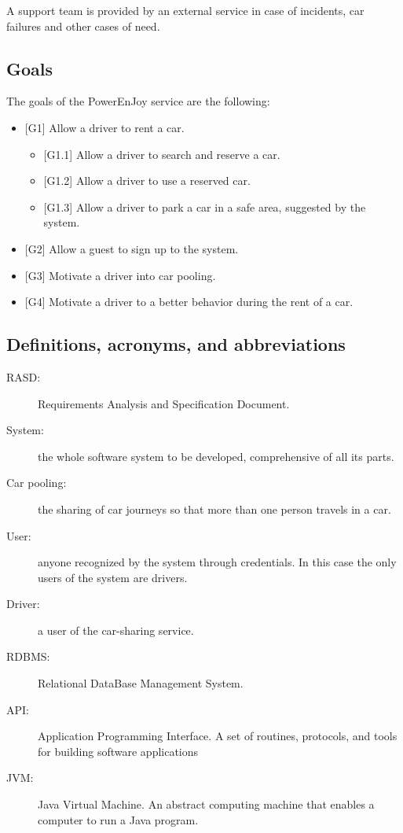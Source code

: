 A support team is provided by an external service in case of incidents, car failures and other cases of need.

\subsection{Goals}
The goals of the PowerEnJoy service are the following:
\begin{itemize}
	\item {[G1]} Allow a driver to rent a car. 
	\begin{itemize}
		\item {[G1.1]} Allow a driver to search and reserve a car. 
		\item {[G1.2]} Allow a driver to use a reserved car. 
		\item {[G1.3]} Allow a driver to park a car in a safe area, suggested by the system.
	\end{itemize} 
	\item {[G2]} Allow a guest to sign up to the system. 
	\item {[G3]} Motivate a driver into car pooling. 
	\item {[G4]} Motivate a driver to a better behavior during the rent of a car. 
\end{itemize}

\subsection{Definitions, acronyms, and abbreviations}

\begin{description}
	\item[RASD:] Requirements Analysis and Specification Document.
	\item[System:] the whole software system to be developed, comprehensive of all its parts.
	\item[Car pooling:] the sharing of car journeys so that more than one person travels in a car.
	\item[User:] anyone recognized by the system through credentials. In this case the only users of the system are drivers. 
	\item[Driver:] a user of the car-sharing service.
	\item[RDBMS:] Relational DataBase Management System.	
	\item[API:] Application Programming Interface. A set of routines, protocols, and tools for building software applications
	\item[JVM:] Java Virtual Machine. An abstract computing machine that enables a computer to run a Java program.
\end{description}

